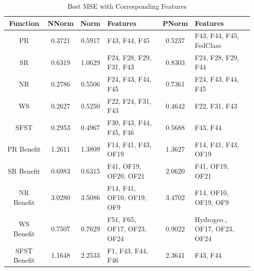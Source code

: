 \documentclass[12pt,letterpaper]{article}
\begin{document}
\begin{table}[H]
\centering
\begin{tabular}{|c|c|c|p{4cm}|c|p{4cm}|}
\hline
\textbf{Function} & \textbf{\ac{NNorm}} & \textbf{Norm} & \textbf{Features} & \textbf{\ac{PNorm}} & \textbf{Features} \\
\hline
PR & 0.3721 & 0.5917 & F43, F44, F45 & 0.5237 & F43, F44, F45, FedClass \\
\hline
SR & 0.6319 & 1.0629 & F24, F28, F29, F31, F43 & 0.8303 & F24, F28, F29, F44 \\
\hline
NR & 0.2786 & 0.5506 & F24, F43, F44, F45 & 0.7361 & F24, F43, F44, F45 \\
\hline
WS & 0.2627 & 0.5250 & F22, F24, F31, F43 & 0.4642 & F22, F31, F43 \\
\hline
SFST & 0.2953 & 0.4967 & F30, F43, F44, F45, F46 & 0.5688 & F43, F44\\
\hline
\hline
PR Benefit & 1.2611 & 1.3809 & F14, F41, F43, OF19 & 1.3627 & F14, F41, F43, OF19 \\
\hline
SR Benefit & 0.6983 & 0.6315 & F41, OF19, OF20, OF21 & 2.0620 & F41, OF19, OF21 \\
\hline
NR Benefit & 3.0280 & 3.5086 & F14, F41, OF10, OF19, OF9 & 3.4702 & F14, OF10, OF19, OF9 \\
\hline
WS Benefit & 0.7507 & 0.7629 & F51, F65, OF17, OF23, OF24 & 0.9022 &  Hydrogeo., OF17, OF23, OF24 \\
\hline
SFST Benefit & 1.1648 & 2.2533 & F1, F43, F44, F46 & 2.3641 & F43, F44 \\
\hline
\end{tabular}
\caption{Best MSE with Corresponding Features}
\label{reg_all_tab:featred_res}
\end{table}
\end{document}
